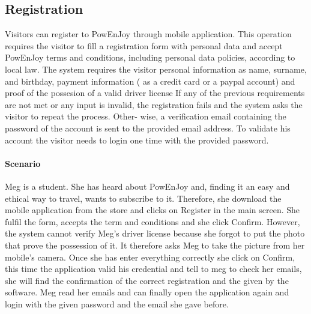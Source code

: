 \subsection{Registration}
Visitors can register to PowEnJoy through mobile application. This operation requires the visitor to fill a registration form with personal data and accept PowEnJoy terms and conditions, including personal data policies, according to local law. The system requires the visitor personal information as name, surname, and birthday, payment information ( as a credit card or a paypal account) and proof of the possesion of a valid driver license
If any of the previous requirements are not met or any input is invalid, the registration fails and the system asks the visitor to repeat the process. Other- wise, a verification email containing the password of the account is sent to the provided email address. To validate his account the visitor needs to login one time with the provided password.
\paragraph{Scenario}
Meg is a student. She has heard about PowEnJoy and, finding it an easy and ethical way to travel, wants to subscribe to it.
Therefore, she download the mobile application from the store and clicks on Register in the main screen. She fulfil the form, accepts the term and conditions  and she click Confirm. However, the system cannot verify Meg's driver license because she forgot to put the photo that prove the possession of it. It therefore asks Meg to take the picture from her mobile's camera. Once she has enter everything correctly she click on Confirm, this time the application valid his credential and tell to meg to check her emails, she will find the confirmation of the correct registration and the given by the software. Meg read her emails and can finally open the application again and login with the given password and the email she gave before.
